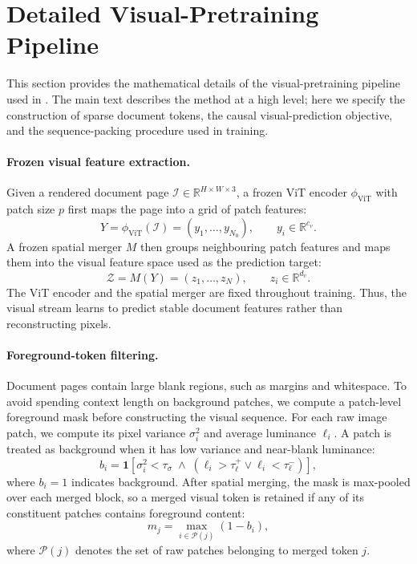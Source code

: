 \section{Detailed Visual-Pretraining Pipeline}
\label{sec:appendix_pipeline}

This section provides the mathematical details of the visual-pretraining pipeline used in \methodname. The main text describes the method at a high level; here we specify the construction of sparse document tokens, the causal visual-prediction objective, and the sequence-packing procedure used in training.

\paragraph{Frozen visual feature extraction.}
Given a rendered document page $\mathcal{I}\in\mathbb{R}^{H\times W\times 3}$, a frozen ViT encoder $\phi_{\mathrm{ViT}}$ with patch size $p$ first maps the page into a grid of patch features:
\begin{equation}
Y
=
\phi_{\mathrm{ViT}}(\mathcal{I})
=
(y_1,\ldots,y_{N_0}),
\qquad
y_i\in\mathbb{R}^{c_v}.
\label{eq:appendix_vit_features}
\end{equation}
A frozen spatial merger $M$ then groups neighbouring patch features and maps them into the visual feature space used as the prediction target:
\begin{equation}
\mathcal{Z}
=
M(Y)
=
(z_1,\ldots,z_N),
\qquad
z_i\in\mathbb{R}^{d_v}.
\label{eq:appendix_merged_features}
\end{equation}
The ViT encoder and the spatial merger are fixed throughout training. Thus, the visual stream learns to predict stable document features rather than reconstructing pixels.

\paragraph{Foreground-token filtering.}
Document pages contain large blank regions, such as margins and whitespace. To avoid spending context length on background patches, we compute a patch-level foreground mask before constructing the visual sequence. For each raw image patch, we compute its pixel variance $\sigma_i^2$ and average luminance $\ell_i$. A patch is treated as background when it has low variance and near-blank luminance:
\begin{equation}
b_i
=
\mathbf{1}
\left[
\sigma_i^2<\tau_{\sigma}
\;\land\;
\left(
\ell_i>\tau_{\ell}^{+}
\lor
\ell_i<\tau_{\ell}^{-}
\right)
\right],
\label{eq:appendix_background_mask}
\end{equation}
where $b_i=1$ indicates background. After spatial merging, the mask is max-pooled over each merged block, so a merged visual token is retained if any of its constituent patches contains foreground content:
\begin{equation}
m_j
=
\max_{i\in\mathcal{P}(j)}
(1-b_i),
\label{eq:appendix_merged_mask}
\end{equation}
where $\mathcal{P}(j)$ denotes the set of raw patches belonging to merged token $j$.

